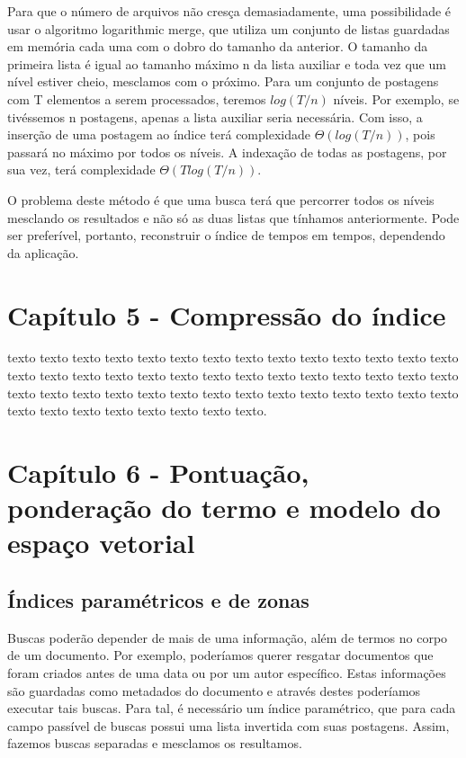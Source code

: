Para que o número de arquivos não cresça demasiadamente, uma possibilidade é usar o algoritmo logarithmic merge, que utiliza um conjunto de listas guardadas em memória cada uma com o dobro do tamanho da anterior. O tamanho da primeira lista é igual ao tamanho máximo n da lista auxiliar e toda vez que um nível estiver cheio, mesclamos com o próximo. Para um conjunto de postagens com T elementos a serem processados, teremos $log( T/n )$ níveis. Por exemplo, se tivéssemos n postagens, apenas a lista auxiliar seria necessária. Com isso, a inserção de uma postagem ao índice terá complexidade $\Theta( log( T/n ))$, pois passará no máximo por todos os níveis. A indexação de todas as postagens, por sua vez, terá complexidade $\Theta( T log(T/n ))$.

O problema deste método é que uma busca terá que percorrer todos os níveis mesclando os resultados e não só as duas listas que tínhamos anteriormente. Pode ser preferível, portanto, reconstruir o índice de tempos em tempos, dependendo da aplicação.


\section{Capítulo 5 - Compressão do índice}
\label{sec:compressao_indice}

texto texto texto texto texto texto texto texto
texto texto texto texto texto texto texto texto texto texto texto texto texto
texto texto texto texto texto texto texto texto texto texto texto texto texto
texto texto texto texto texto texto texto texto texto texto texto texto texto
texto texto texto.

\section{Capítulo 6 - Pontuação, ponderação do termo e modelo do espaço vetorial}
\label{sec:espaco_vetorial}

\subsection{Índices paramétricos e de zonas}

Buscas poderão depender de mais de uma informação, além de termos no corpo de um documento. Por exemplo, poderíamos querer resgatar documentos que foram criados antes de uma data ou por um autor específico. Estas informações são guardadas como metadados do documento e através destes poderíamos executar tais buscas. Para tal, é necessário um índice paramétrico, que para cada campo passível de buscas possui uma lista invertida com suas postagens. Assim, fazemos buscas separadas e mesclamos os resultamos.

